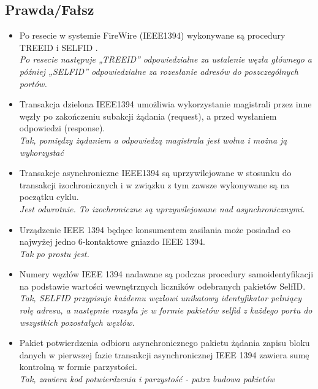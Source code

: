 \subsection*{Prawda/Fałsz}
\begin{itemize}
	
	\item \textcolor{tak}{Po resecie w systemie FireWire (IEEE1394) wykonywane są procedury TREEID  i SELFID .} \\
	{\small \emph{Po resecie następuje „TREEID” odpowiedzialne za ustalenie węzła głównego a później „SELFID” odpowiedzialne za rozesłanie adresów do poszczególnych portów.}}
	
	\item \textcolor{tak}{Transakcja dzielona IEEE1394 umożliwia wykorzystanie magistrali przez inne węzły po zakończeniu subakcji żądania (request), a przed wysłaniem odpowiedzi (response).} \\
	{\small \emph{Tak, pomiędzy żądaniem a odpowiedzą magistrala jest wolna i można ją wykorzystać}}
	
	\item \textcolor{nie}{Transakcje asynchroniczne IEEE1394 są uprzywilejowane w stosunku do transakcji izochronicznych i w związku z tym zawsze wykonywane są na początku cyklu.} \\
	{\small \emph{Jest odwrotnie. To izochroniczne są uprzywilejowane nad asynchronicznymi.}}
	
	\item \textcolor{tak}{Urządzenie IEEE 1394 będące konsumentem zasilania może posiadad co najwyżej jedno 6-kontaktowe gniazdo IEEE 1394.} \\
	{\small \emph{Tak po prostu jest.}}
	
	\item \textcolor{tak}{Numery węzłów IEEE 1394 nadawane są podczas procedury samoidentyfikacji na podstawie wartości wewnętrznych liczników odebranych pakietów SelfID.} \\
	{\small \emph{Tak, SELFID przypisuje każdemu węzłowi unikatowy identyfikator pełniący rolę adresu, a następnie rozsyła je w formie pakietów selfid z każdego portu do wszystkich pozostałych węzłów.}}
	
	\item \textcolor{tak}{Pakiet potwierdzenia odbioru asynchronicznego pakietu żądania zapisu bloku danych w pierwszej fazie transakcji asynchronicznej IEEE 1394 zawiera sumę kontrolną w formie parzystości.} \\
	{\small \emph{Tak, zawiera kod potwierdzenia i parzystość - patrz budowa pakietów}}
	

\end{itemize}
